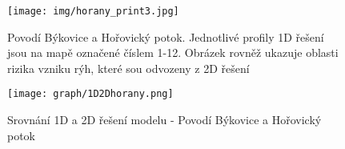 \begin{figure}[t]
\centering
\texttt{[image: img/horany\_print3.jpg]}
\caption{Povodí Býkovice a Hořovický potok. Jednotlivé profily 1D řešení jsou na mapě označené číslem 1-12. Obrázek rovněž ukazuje oblasti rizika vzniku rýh, které sou odvozeny z 2D řešení}
\label{fig:horany1}
\end{figure}%
% 
\begin{figure}[t]
\renewcommand{\figurename}{Graf}
\centering
\texttt{[image: graph/1D2Dhorany.png]}
\caption{Srovnání 1D a 2D řešení modelu \smod - Povodí Býkovice a Hořovický potok}
\label{graf:graf_1}
\end{figure}

\FloatBarrier


% 

